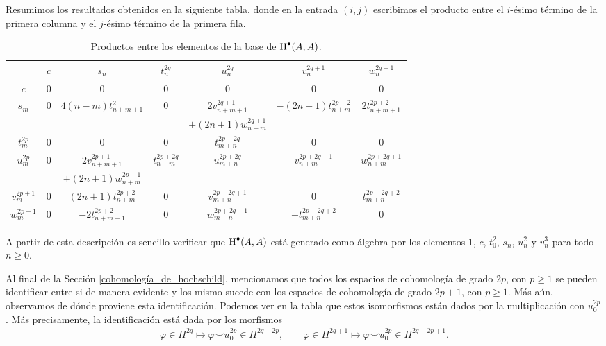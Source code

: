 \documentclass[fleqn,../tesis.tex]{subfiles}
\begin{document}
Resumimos los resultados obtenidos en la siguiente tabla, donde en la entrada $(i, j)$ escribimos
el producto entre el $i$-ésimo término de la primera columna y el $j$-ésimo término de la primera fila. 
\begin{table}[h!]
\begin{center}
\begin{tabular}{ |c|c|c|c|c|c|c| } 
\hline
& $c$ & $s_n$ & $t_n^{2q}$ & $u_n^{2q}$ & $v_n^{2q + 1}$ & $w_n^{2q + 1}$ \\
\hline
$c$ & $0$ & $0$ & $ 0$ & $ 0$ & $0$ & $0$ \\
\hline
$s_m$ & $0$ & $4(n - m)t^{2}_{n + m + 1}$ & $0$ &
	$2v^{2q +1}_{n + m + 1} $
		& $-(2n + 1)t_{n + m}^{2p + 2}$ & $2t_{n + m + 1}^{2p + 2}$ \\
&&&&$+ (2n + 1)w_{n + m}^{2q + 1}$&&\\
\hline
$t_m^{2p}$ & $0$ & $0$ & $0$ & $t_{m + n}^{2p + 2q}$ & $0$ & $0$ \\
\hline
$u_m^{2p}$ & $0$ &$2v^{2p +1}_{n + m + 1} $ & $t_{n + m}^{2p + 2q}$ &
	$u_{m + n}^{2p + 2q}$
		& $v_{n + m}^{2p + 2q + 1}$ & $w_{n + m}^{2p + 2q +1}$ \\
&&$+ (2n + 1)w_{n + m}^{2p + 1}$&&&&\\
\hline
$v_m^{2p + 1}$ & $0$ &$(2n + 1)t_{n + m}^{2p + 2}$ & $0$ &
	$v_{m + n}^{2p + 2q + 1}$
		& $0$ & $t_{m + n}^{2p + 2q + 2}$ \\
\hline
$w_m^{2p + 1}$ & $0$ &$-2t_{n + m + 1}^{2p + 2}$ & $0$ &
	$w_{m + n}^{2p + 2q + 1}$
		& $-t_{m +n}^{2p + 2q + 2}$ & $0$\\
\hline
\end{tabular}
\caption{Productos entre los elementos de la base de $\operatorname{H}^{\bullet}(A, A)$.}
\label{table:1}
\end{center}
\end{table}

A partir de esta descripción es sencillo verificar que $\operatorname{H}^{\bullet}(A,A)$
está generado como álgebra por los elementos $1$, $c$, $t_0^{2}$, $s_n$, $u_n^{2}$ y $v_n^3$ para todo
$n \geq 0$.

Al final de la Sección \ref{cohomología_de_hochschild}, mencionamos que todos los
espacios de cohomología de grado $2p$, con $p\geq 1$ se pueden identificar entre si
de manera evidente y los mismo sucede con los espacios de cohomología de grado $2p + 1$, con $p\geq 1$.
Más aún, observamos de dónde proviene esta identificación. Podemos ver en la tabla que estos isomorfismos
están dados por la multiplicación con $u_{0}^{2p}$. Más precisamente, la identificación está dada por los morfismos
\begin{align*}
	\varphi \in H^{2q} \mapsto \varphi \smile u_{0}^{2p} \in H^{2q + 2p},\qquad
	\varphi \in H^{2q + 1} \mapsto \varphi \smile u_{0}^{2p} \in H^{2q + 2p + 1}.
\end{align*}
\end{document}
